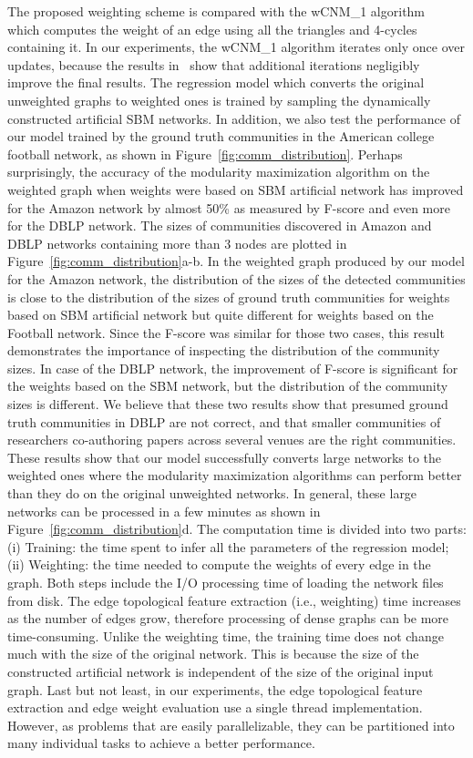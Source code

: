 The proposed weighting scheme is compared with the wCNM\_1 algorithm~\cite{berry2011tolerating} which computes the weight of an edge using all the triangles and 4-cycles containing it. In our experiments, the wCNM\_1 algorithm iterates only once over updates, because the results in~\cite{berry2011tolerating} show that additional iterations negligibly improve the final results. The regression model which converts the original unweighted graphs to weighted ones is trained by sampling the dynamically constructed artificial SBM networks. In addition, we also test the performance of our model trained by the ground truth communities in the American college football network, as shown in Figure~\ref{fig:comm_distribution}. Perhaps surprisingly, the accuracy of the modularity maximization algorithm on the weighted graph when weights were based on SBM artificial network has improved for the Amazon network by almost 50\% as measured by F-score and even more for the DBLP network. 
The sizes of communities discovered in Amazon and DBLP networks containing more than $3$ nodes are plotted in Figure~\ref{fig:comm_distribution}a-b. In the weighted graph produced by our model for the Amazon network, the distribution of the sizes of the detected communities is close to the distribution of the sizes of ground truth communities for weights based on SBM artificial network but quite different for weights based on the Football network. Since the F-score was similar for those two cases, this result demonstrates the importance of inspecting the distribution of the community sizes. In case of the DBLP network, the improvement of F-score is significant for the weights based on the SBM network, but the distribution of the community sizes is different. We believe that these two results show that presumed ground truth communities in DBLP are not correct, and that smaller communities of researchers co-authoring papers across several venues are the right communities. These results show that our model successfully converts large networks to the weighted ones where the modularity maximization algorithms can perform better than they do on the original unweighted networks.
In general, these large networks can be processed in a few minutes as shown in Figure~\ref{fig:comm_distribution}d. The computation time is divided into two parts: (i) Training: the time spent to infer all the parameters of the regression model; (ii) Weighting: the time needed to compute the weights of every edge in the graph. Both steps include the I/O processing time of loading the network files from disk. The edge topological feature extraction (i.e., weighting) time increases as the number of edges grow, therefore processing of dense graphs can be more time-consuming. Unlike the weighting time, the training time does not change much with the size of the original network. This is because the size of the constructed artificial network is independent of the size of the original input graph. Last but not least, in our experiments, the edge topological feature extraction and edge weight evaluation use a single thread implementation. However, as problems that are easily parallelizable, they can be partitioned into many individual tasks to achieve a better performance.



